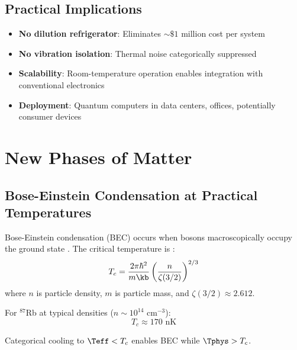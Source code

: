 \subsection{Practical Implications}

\begin{itemize}
    \item \textbf{No dilution refrigerator}: Eliminates $\sim \$1$ million cost per system

    \item \textbf{No vibration isolation}: Thermal noise categorically suppressed

    \item \textbf{Scalability}: Room-temperature operation enables integration with conventional electronics

    \item \textbf{Deployment}: Quantum computers in data centers, offices, potentially consumer devices
\end{itemize}

\section{New Phases of Matter}

\subsection{Bose-Einstein Condensation at Practical Temperatures}

Bose-Einstein condensation (BEC) occurs when bosons macroscopically occupy the ground state \cite{bose1924,einstein1925}. The critical temperature is \cite{pitaevskii2003}:
\begin{equation}
T_c = \frac{2\pi\hbar^2}{m\kb} \left(\frac{n}{\zeta(3/2)}\right)^{2/3}
\label{eq:bec_tc}
\end{equation}
where $n$ is particle density, $m$ is particle mass, and $\zeta(3/2) \approx 2.612$.

For $^{87}$Rb at typical densities ($n \sim 10^{14}$ cm$^{-3}$):
\begin{equation}
T_c \approx 170 \text{ nK}
\end{equation}

\begin{theorem}
\label{thm:warm_bec}
Categorical cooling to $\Teff < T_c$ enables BEC while $\Tphys > T_c$.
\end{theorem}

